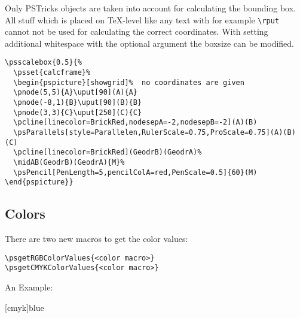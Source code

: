 \documentclass[11pt,english,BCOR=10mm,DIV=12,bibliography=totoc,parskip=false,headings=small,
    headinclude=false,footinclude=false,twoside,usegeometry,dvipsnames]{pst-doc}
\def\Lcs#1{\texttt{\textbackslash#1}}
\begin{document}
Only PSTricks objects are taken into account for calculating the bounding box. All stuff
which is placed on \TeX-level like any text with for example \Lcs{rput} cannot not be
used for calculating the correct coordinates. With setting additional whitespace with
the optional argument  the boxsize can be modified.



\begin{lstlisting}
\psscalebox{0.5}{%
  \psset{calcframe}%
  \begin{pspicture}[showgrid]%  no coordinates are given
  \pnode(5,5){A}\uput[90](A){A}
  \pnode(-8,1){B}\uput[90](B){B}
  \pnode(3,3){C}\uput[250](C){C} 
  \pcline[linecolor=BrickRed,nodesepA=-2,nodesepB=-2](A)(B) 
  \psParallels[style=Parallelen,RulerScale=0.75,ProScale=0.75](A)(B)(C) 
  \pcline[linecolor=BrickRed](GeodrB)(GeodrA)% 
  \midAB(GeodrB)(GeodrA){M}% 
  \psPencil[PenLength=5,pencilColA=red,PenScale=0.5]{60}(M) 
\end{pspicture}}
\end{lstlisting}



\subsection{Colors}

There are two new macros to get the color values:

\begin{verbatim}
\psgetRGBColorValues{<color macro>}
\psgetCMYKColorValues{<color macro>}
\end{verbatim}

An Example:

\begin{LTXexample}[width=5cm]
\psgetRGBColorValues{\pslinecolor}

[cmyk]{blue}
\psgetCMYKColorValues{\pslinecolor}
\end{LTXexample}
\end{document}
